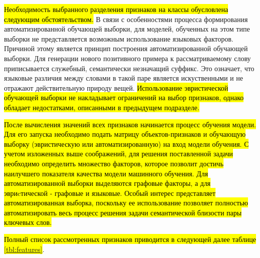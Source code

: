 \hl{Необходимость выбранного разделения признаков на классы обусловлена следующим обстоятельством.} В связи с особенностями процесса формирования автоматизированной обучающей выборки, для моделей, обученных на этом типе выборки не представляется возможным использование языковых факторов. Причиной этому является принцип построения автоматизированной обучающей выборки. Для генерации нового позитивного примера к рассматриваемому слову приписывается служебный, семантически незначащий суффикс. Это означает, что языковые различия между словами в такой паре является искуственными  и не отражают действительную природу вещей. \hl{Использование эвристической обучающей выборки не накладывает ограничений на выбор признаков, однако обладает недостатками, описанными в предыдущем подразделе.}

\hl{После вычисления значений всех признаков начинается процесс обучения модели. Для его запуска необходимо подать матрицу объектов-признаков и обучающую выборку (эвристическую или автоматизированную) на вход модели обучения. С учетом изложенных выше соображений, для решения поставленной задачи необходимо определить множество факторов, которое позволит достичь наилучшего показателя качества модели машинного обучения. Для автоматизированной выборки выделяются графовые факторы, а для эвриcтической - графовые и языковые. Особый интерес представляет автоматизированная выборка, поскольку ее использование позволяет полностью автоматизировать весь процесс решения задачи семантической близости пары ключевых слов.}

\hl{Полный список рассмотренных признаков приводится в следующей далее таблице \ref{tbl:features}}.


